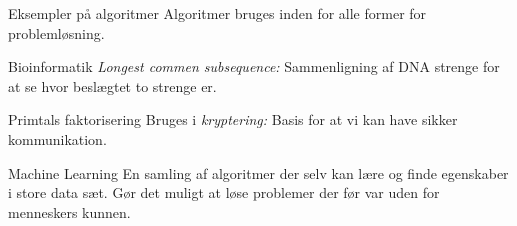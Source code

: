 \documentclass[12pt,t]{beamer}
\begin{document}
    \begin{frame}[t]{Eksempler på algoritmer}
          Algoritmer bruges inden for alle former for problemløsning. \pause
        \begin{block}{Bioinformatik}
            \emph{Longest commen subsequence: } Sammenligning af DNA strenge
            for at se hvor beslægtet to strenge er. \pause
        \end{block}
        \begin{block}{Primtals faktorisering}
            Bruges i \emph{kryptering: } Basis for at vi kan have sikker
            kommunikation. \pause
        \end{block}

        \begin{block}{Machine Learning}
            En samling af algoritmer der selv kan lære og finde egenskaber
            i store data sæt. Gør det muligt at løse problemer der før var
            uden for menneskers kunnen.
        \end{block}
    \end{frame}
\end{document}

